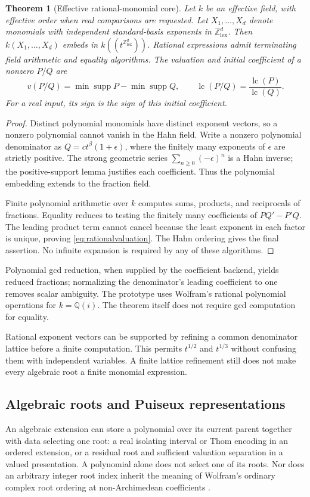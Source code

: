 \documentclass[11pt,letterpaper]{article}
\newtheorem{theorem}{Theorem}[section]
\theoremstyle{definition}\newtheorem{definition}[theorem]{Definition}
\theoremstyle{remark}\newtheorem{remark}[theorem]{Remark}
\newcommand{\Q}{\mathbb Q}\newcommand{\N}{\mathbb N}\newcommand{\Z}{\mathbb Z}
\newcommand{\supp}{\operatorname{supp}}\newcommand{\lc}{\operatorname{lc}}
\numberwithin{equation}{section}\setcounter{tocdepth}{2}
\begin{document}
\begin{theorem}[Effective rational-monomial core]\label{thm:rationalcore}
Let $k$ be an effective field, with effective order when real comparisons are requested. Let $X_1,\ldots,X_d$ denote monomials with independent standard-basis exponents in $\Z^d_{\mathrm{lex}}$. Then $k(X_1,\ldots,X_d)$ embeds in $k((t^{\Z^d_{\mathrm{lex}}}))$. Rational expressions admit terminating field arithmetic and equality algorithms. The valuation and initial coefficient of a nonzero $P/Q$ are
\begin{equation}\label{eq:rationalvaluation}
 v(P/Q)=\min\supp P-\min\supp Q,\qquad
 \lc(P/Q)=\frac{\lc(P)}{\lc(Q)}.
\end{equation}
For a real input, its sign is the sign of this initial coefficient.
\end{theorem}
\begin{proof}
Distinct polynomial monomials have distinct exponent vectors, so a nonzero polynomial cannot vanish in the Hahn field. Write a nonzero polynomial denominator as $Q=c t^\beta(1+\epsilon)$, where the finitely many exponents of $\epsilon$ are strictly positive. The strong geometric series $\sum_{n\ge0}(-\epsilon)^n$ is a Hahn inverse; the positive-support lemma justifies each coefficient. Thus the polynomial embedding extends to the fraction field.

Finite polynomial arithmetic over $k$ computes sums, products, and reciprocals of fractions. Equality reduces to testing the finitely many coefficients of $PQ'-P'Q$. The leading product term cannot cancel because the least exponent in each factor is unique, proving \eqref{eq:rationalvaluation}. The Hahn ordering gives the final assertion. No infinite expansion is required by any of these algorithms.
\end{proof}
Polynomial gcd reduction, when supplied by the coefficient backend, yields reduced fractions; normalizing the denominator's leading coefficient to one removes scalar ambiguity. The prototype uses Wolfram's rational polynomial operations for $k=\Q(i)$. The theorem itself does not require gcd computation for equality.

Rational exponent vectors can be supported by refining a common denominator lattice before a finite computation. This permits $t^{1/2}$ and $t^{1/3}$ without confusing them with independent variables. A finite lattice refinement still does not make every algebraic root a finite monomial expression.

\subsection{Algebraic roots and Puiseux representations}
An algebraic extension can store a polynomial over its current parent together with data selecting one root: a real isolating interval or Thom encoding in an ordered extension, or a residual root and sufficient valuation separation in a valued presentation. A polynomial alone does not select one of its roots. Nor does an arbitrary integer root index inherit the meaning of Wolfram's ordinary complex root ordering at non-Archimedean coefficients \cite{WLRoot}.
\end{document}
